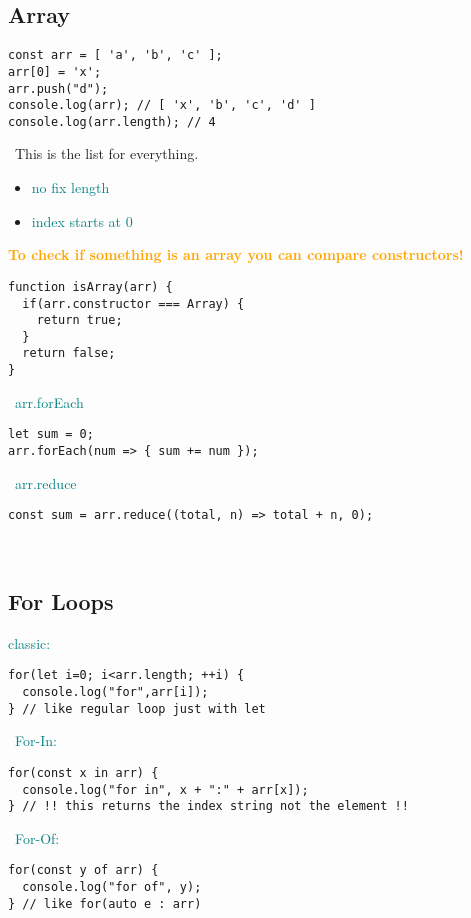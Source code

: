 \documentclass[main.tex,fontsize=6pt,paper=a4,paper=landscape,DIV=calc,]{scrartcl}
\begin{document}
\begin{multicols*}{4}
\subsection{Array}  
\begin{lstlisting}
const arr = [ 'a', 'b', 'c' ];
arr[0] = 'x';
arr.push("d");
console.log(arr); // [ 'x', 'b', 'c', 'd' ]
console.log(arr.length); // 4
\end{lstlisting}
\, \newline
This is the list for everything.\newline
\begin{itemize}
  \item \textcolor{teal}{no fix length}
  \item \textcolor{teal}{index starts at 0}
  
\end{itemize}
\textcolor{orange}{\textbf{To check if something is an array you can compare constructors!}}\newline
\begin{lstlisting}
function isArray(arr) {
  if(arr.constructor === Array) {
    return true;
  }
  return false;
}
\end{lstlisting}
\, \newline
\textcolor{teal}{arr.forEach}\newline
\begin{lstlisting}
let sum = 0;
arr.forEach(num => { sum += num });
\end{lstlisting}
\, \newline
\textcolor{teal}{arr.reduce}\newline
\begin{lstlisting}
const sum = arr.reduce((total, n) => total + n, 0);
\end{lstlisting}
\, \newline


\subsection{For Loops}  
\textcolor{teal}{classic:}
\begin{lstlisting}
for(let i=0; i<arr.length; ++i) {
  console.log("for",arr[i]);
} // like regular loop just with let
\end{lstlisting}
\, \newline
\textcolor{teal}{For-In:}
\begin{lstlisting}
for(const x in arr) {
  console.log("for in", x + ":" + arr[x]);
} // !! this returns the index string not the element !!
\end{lstlisting}
\, \newline
\textcolor{teal}{For-Of:}
\begin{lstlisting}
for(const y of arr) {
  console.log("for of", y);
} // like for(auto e : arr)
\end{lstlisting}
\, \newline



\end{multicols*}
\end{document}
